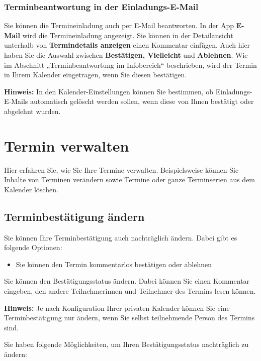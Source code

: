 \documentclass[
  letterpaper,
  DIV=11,
  numbers=noendperiod]{scrreprt}
\providecommand{\tightlist}{%
  \setlength{\itemsep}{0pt}\setlength{\parskip}{0pt}}\usepackage{longtable,booktabs,array}
\begin{document}
\subsubsection{Terminbeantwortung in der
Einladungs-E-Mail}\label{terminbeantwortung-in-der-einladungs-e-mail}

Sie können die Termineinladung auch per E-Mail beantworten. In der App
\textbf{E-Mail} wird die Termineinladung angezeigt. Sie können in der
Detailansicht unterhalb von \textbf{Termindetails anzeigen} einen
Kommentar einfügen. Auch hier haben Sie die Auswahl zwischen
\textbf{Bestätigen, Vielleicht} und \textbf{Ablehnen}. Wie im Abschnitt
„Terminbeantwortung im Infobereich`` beschrieben, wird der Termin in
Ihrem Kalender eingetragen, wenn Sie diesen bestätigen.

\textbf{Hinweis:} In den Kalender-Einstellungen können Sie bestimmen, ob
Einladungs-E-Mails automatisch gelöscht werden sollen, wenn diese von
Ihnen bestätigt oder abgelehnt wurden.

\section{Termin verwalten}\label{termin-verwalten}

Hier erfahren Sie, wie Sie Ihre Termine verwalten. Beispielsweise können
Sie Inhalte von Terminen verändern sowie Termine oder ganze Terminserien
aus dem Kalender löschen.

\subsection{Terminbestätigung
ändern}\label{terminbestuxe4tigung-uxe4ndern}

Sie können Ihre Terminbestätigung auch nachträglich ändern. Dabei gibt
es folgende Optionen:

\begin{itemize}
\tightlist
\item
  Sie können den Termin kommentarlos bestätigen oder ablehnen
\end{itemize}

Sie können den Bestätigungsstatus ändern. Dabei können Sie einen
Kommentar eingeben, den andere Teilnehmerinnen und Teilnehmer des
Termins lesen können.

\textbf{Hinweis:} Je nach Konfiguration Ihrer privaten Kalender können
Sie eine Terminbestätigung nur ändern, wenn Sie selbst teilnehmende
Person des Termins sind.

Sie haben folgende Möglichkeiten, um Ihren Bestätigungsstatus
nachträglich zu ändern:
\end{document}
